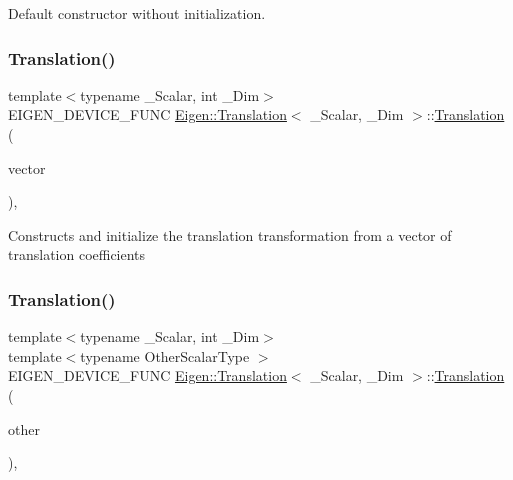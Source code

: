 Default constructor without initialization. \mbox{\label{class_eigen_1_1_translation_a15486f7732b28f0f9e8515de754bc78d}} 
\subsubsection{\texorpdfstring{Translation()}{Translation()}\hspace{0.1cm}{\footnotesize\ttfamily [2/3]}}
{\footnotesize\ttfamily template$<$typename \+\_\+\+Scalar, int \+\_\+\+Dim$>$ \\
E\+I\+G\+E\+N\+\_\+\+D\+E\+V\+I\+C\+E\+\_\+\+F\+U\+NC \mbox{\hyperlink{class_eigen_1_1_translation}{Eigen\+::\+Translation}}$<$ \+\_\+\+Scalar, \+\_\+\+Dim $>$\+::\mbox{\hyperlink{class_eigen_1_1_translation}{Translation}} (\begin{DoxyParamCaption}\item[{const \mbox{\hyperlink{class_eigen_1_1_translation_a339e17dfec5394ae563f62cca0df451f}{Vector\+Type}} \&}]{vector }\end{DoxyParamCaption})\hspace{0.3cm}{\ttfamily [inline]}, {\ttfamily [explicit]}}

Constructs and initialize the translation transformation from a vector of translation coefficients \mbox{\label{class_eigen_1_1_translation_a8d5e06de92ca432d94f661ace3f0a274}} 
\subsubsection{\texorpdfstring{Translation()}{Translation()}\hspace{0.1cm}{\footnotesize\ttfamily [3/3]}}
{\footnotesize\ttfamily template$<$typename \+\_\+\+Scalar, int \+\_\+\+Dim$>$ \\
template$<$typename Other\+Scalar\+Type $>$ \\
E\+I\+G\+E\+N\+\_\+\+D\+E\+V\+I\+C\+E\+\_\+\+F\+U\+NC \mbox{\hyperlink{class_eigen_1_1_translation}{Eigen\+::\+Translation}}$<$ \+\_\+\+Scalar, \+\_\+\+Dim $>$\+::\mbox{\hyperlink{class_eigen_1_1_translation}{Translation}} (\begin{DoxyParamCaption}\item[{const \mbox{\hyperlink{class_eigen_1_1_translation}{Translation}}$<$ Other\+Scalar\+Type, Dim $>$ \&}]{other }\end{DoxyParamCaption})\hspace{0.3cm}{\ttfamily [inline]}, {\ttfamily [explicit]}}

